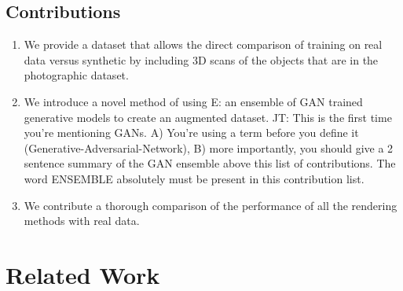 \documentclass[10pt,twocolumn,letterpaper]{article}
\newcommand{\tompson}[1]{{\color{green} JT: #1}}
\newcommand{\edit}[1]{{\color{red} E: #1}}
\begin{document}
\subsection{Contributions}
\begin{enumerate}
\item We provide a dataset that allows the direct comparison of training on real data versus synthetic by including 3D scans of the objects that are in the photographic dataset.
\item We introduce a novel method of using \edit{an ensemble of} GAN trained generative models to create an augmented dataset. \tompson{This is the first time you're mentioning GANs. A) You're using a term before you define it (Generative-Adversarial-Network), B) more importantly, you should give a 2 sentence summary of the GAN ensemble above this list of contributions. The word ENSEMBLE absolutely must be present in this contribution list.}
\item We contribute a thorough comparison of the performance of all the rendering methods with real data.
\end{enumerate}
\section{Related Work}
\end{document}
